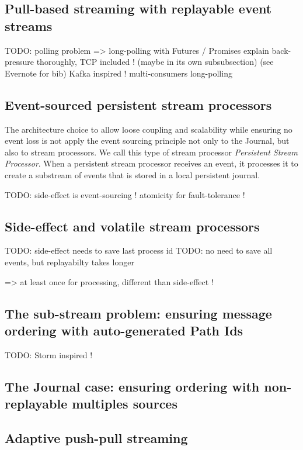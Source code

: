\subsection{Pull-based streaming with replayable event streams}




TODO: polling problem => long-polling with Futures / Promises
explain back-pressure thoroughly, TCP included ! (maybe in its own subsubsection) (see Evernote for bib)
Kafka inspired ! multi-consumers long-polling

\subsection{Event-sourced persistent stream processors}

The architecture choice to allow loose coupling and scalability while ensuring no event loss is not apply the event sourcing principle not only to the Journal, but also to 
stream processors. We call this type of stream processor \textit{Persistent Stream Processor}. When a persistent stream processor receives an event, it processes it 
to create a substream of events that is stored in a local persistent journal.

TODO: side-effect is event-sourcing ! atomicity for fault-tolerance !

\subsection{Side-effect and volatile stream processors}

TODO: side-effect needs to save last process id
TODO: no need to save all events, but replayabilty takes longer

=> at least once for processing, different than side-effect !

\subsection{The sub-stream problem: ensuring message ordering with auto-generated Path Ids}


TODO: Storm inspired !

\subsection{The Journal case: ensuring ordering with non-replayable multiples sources}


\subsection{Adaptive push-pull streaming}

